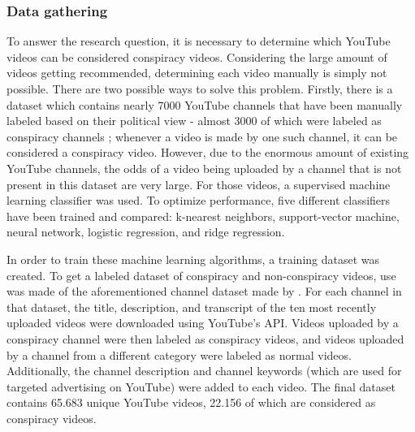 \documentclass[../main.tex]{subfiles}
\begin{document}
\subsubsection{Data gathering}
To answer the research question, it is necessary to determine which YouTube videos can be considered
conspiracy videos. Considering the large amount of videos getting recommended, determining each video
manually is simply not possible. There are two possible ways to solve this problem. Firstly, there is a
dataset which contains nearly 7000 YouTube channels that have been manually labeled based on their
political view - almost 3000 of which were labeled as conspiracy channels \citep{ledwich2019algorithmic};
whenever a video is made by one such channel, it can be considered a conspiracy video. However, due to
the enormous amount of existing YouTube channels, the odds of a video being uploaded by a channel that
is not present in this dataset are very large. For those videos, a supervised machine learning
classifier was used. To optimize performance, five different classifiers have been trained and compared:
k-nearest neighbors, support-vector machine, neural network, logistic regression, and ridge regression. 

In order to train these machine learning algorithms, a training dataset was created. To get a labeled
dataset of conspiracy and non-conspiracy videos, use was made of the aforementioned channel dataset made
by \citet{ledwich2019algorithmic}. For each channel in that dataset, the title, description, and
transcript of the ten most recently uploaded videos were downloaded using YouTube's API. Videos uploaded
by a conspiracy channel were then labeled as conspiracy videos, and videos uploaded by a channel from a
different category were labeled as normal videos. Additionally, the channel description and channel
keywords (which are used for targeted advertising on YouTube) were added to each video. The final
dataset contains 65.683 unique YouTube videos, 22.156 of which are considered as conspiracy videos. 
\end{document}
